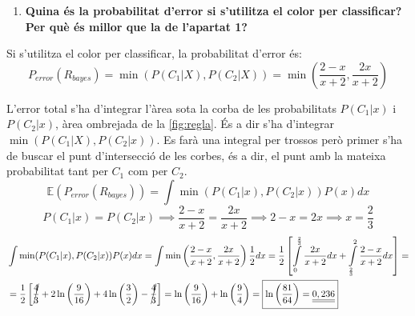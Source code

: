 \documentclass[a4paper]{article}
\begin{document}
\begin{enumerate}[resume]
	\item \textbf{Quina és la probabilitat d'error si s'utilitza el color per classificar? Per què és millor que la de l'apartat 1?}
\end{enumerate}

Si s'utilitza el color per classificar, la probabilitat d'error és:
$$
P_{error}(R_{bayes}) = \min(P(C_1|X),P(C_2|X)) = 
\boxed{\min\left(\frac{2 - x}{x + 2},\frac{2x}{x + 2}\right)}
$$

L'error total s'ha d'integrar l'àrea sota la corba de les probabilitats $P(C_1|x)$ i $P(C_2|x)$, àrea ombrejada de la \autoref{fig:regla}. És a dir s'ha d'integrar $\min(P(C_1|X),P(C_2|x))$. Es farà una integral per trossos però primer s'ha de buscar el punt d'intersecció de les corbes, és a dir, el punt amb la mateixa probabilitat tant per $C_1$ com per $C_2$.
$$
\mathbb{E}(P_{error}(R_{bayes})) = \int \min(P(C_1|x),P(C_2|x))P(x) dx
$$
$$
P(C_1|x) = P(C_2|x) \implies \frac{2 - x}{x + 2} = \frac{2x}{x + 2} \implies
2 - x = 2x \implies \boxed{x = \frac{2}{3}}
$$
\begin{align*}
& \int \min(P(C_1|x),P(C_2|x))P(x) dx = 
\int \min\left(\frac{2 - x}{x + 2},\frac{2x}{x + 2}\right)\frac{1}{2} dx =
\frac{1}{2}\left[\int\limits_{0}^{\frac{2}{3}} \frac{2x}{x + 2} dx + 
\int\limits_{\frac{2}{3}}^{2} \frac{2 - x}{x + 2} dx \right] = \\
& = \frac{1}{2}\left[\cancel{\frac{4}{3}} + 2\ln\left(\frac{9}{16}\right) + 
4\ln\left(\frac{3}{2} \right) - \cancel{\frac{4}{3}}\right] = 
\ln\left(\frac{9}{16}\right) + \ln\left( \frac{9}{4} \right) =
\boxed{\ln\left(\frac{81}{64}\right) = \underline{\underline{0,236}}}
\end{align*}
\end{document}
